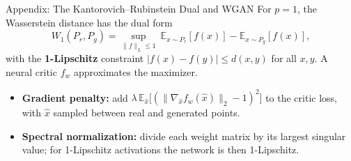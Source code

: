 \documentclass[10pt,aspectratio=169]{ntuabeamer}
\newcommand{\E}{\mathbb{E}}
\begin{document}
	\begin{frame}{Appendix: The Kantorovich--Rubinstein Dual and WGAN}
		\small
		For $p=1$, the Wasserstein distance has the dual form
		$$ W_1(P_r, P_g) = \sup_{\|f\|_L \le 1} \ \E_{x \sim P_r}[f(x)] - \E_{x \sim P_g}[f(x)], $$
		with the \textbf{1-Lipschitz} constraint $|f(x)-f(y)|\le d(x,y)$ for all $x,y$.
		A neural critic $f_w$ approximates the maximizer.

		\begin{itemize}
			\item \textbf{Gradient penalty:} add $\lambda\,\E_{\hat x}\big[(\|\nabla_{\hat x} f_w(\hat x)\|_2-1)^2\big]$ to the critic loss, with $\hat x$ sampled between real and generated points.
			\item \textbf{Spectral normalization:} divide each weight matrix by its largest singular value; for 1-Lipschitz activations the network is then 1-Lipschitz.
		\end{itemize}
	\end{frame}
\end{document}
